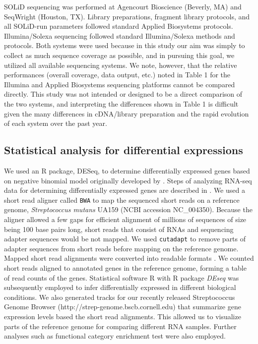 \documentclass{article}
\newcommand{\Rpackage}[1]{R package \textit{#1}}
\newcommand{\program}[1]{{\texttt{#1}}}
\begin{document}
SOLiD sequencing was performed at Agencourt Bioscience (Beverly, MA) and
SeqWright (Houston, TX). Library preparations, fragment library protocols, and
all SOLiD-run parameters followed standard Applied Biosystems protocols.
Illumina/Solexa sequencing followed standard Illumina/Solexa methods and
protocols. Both systems were used because in this study our aim was simply to
collect as much sequence coverage as possible, and in pursuing this goal, we
utilized all available sequencing systems. We note, however, that the relative
performances (overall coverage, data output, etc.) noted in Table 1 for the
Illumina and Applied Biosystems sequencing platforms cannot be compared
directly. This study was not intended or designed to be a direct comparison of
the two systems, and interpreting the differences shown in Table 1 is difficult
given the many differences in cDNA/library preparation and the rapid evolution
of each system over the past year.

\subsection{Statistical analysis for differential expressions}
We used an R package, DESeq, \cite{Anders2010} to determine differentially
expressed genes based on negative binomial model originally developed by \cite{Robinson2007}.
Steps of analyzing RNA-seq data for determining differentially expressed genes
are described in \cite{Oshlack2010}. We used a short read aligner called
\program{BWA} \cite{Li2009a} to map the sequenced short reads on a reference genome,
\textit{Streptococcus mutans} UA159 (NCBI accession NC\_004350). Because the
aligner allowed a few gaps for efficient alignment of millions of sequences of
size being 100 base pairs long, short reads that consist of RNAs and sequencing
adapter sequences would be not mapped. We used \program{cutadapt} \cite{Martin2011} to
remove parts of adapter sequences from short reads before mapping on the
reference genome. Mapped short read alignments were converted into readable
formats \cite{Li2009b}. We counted short reads aligned to annotated genes in the
reference genome, forming a table of read counts of the genes. Statistical
software R \cite{R2011} with \Rpackage{DEseq} \cite{Anders2010}
was subsequently employed to infer differentially expressed in different
biological conditions.  We also generated tracks for our recently released
Streptococcus Genome Browser (http://strep-genome.bscb.cornell.edu) that
summarize gene expression levels based the short read alignments. This allowed
us to visualize parts of the reference genome for comparing different RNA
samples. Further analyses such as functional category enrichment test
\cite{Young2010} were also employed.
\end{document}

